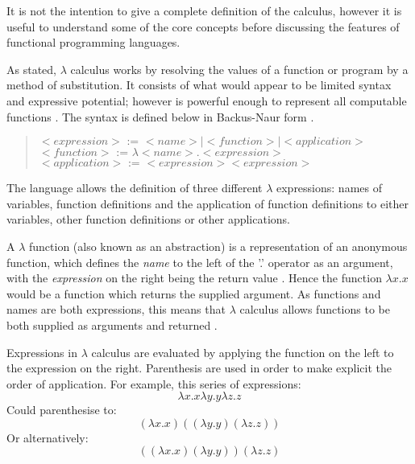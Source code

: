 \documentclass[12pt,a4paper]{article}
\begin{document}
It is not the intention to give a complete definition of the calculus, however it is useful to understand some of the core concepts before discussing the features of functional programming languages.

As stated, $\lambda$ calculus works by resolving the values of a function or program by a method of substitution. It consists of what would appear to be limited syntax and expressive potential; however is powerful enough to represent all computable functions \cite{church1936}. The syntax is defined below in Backus-Naur form \cite{bnf}.

\begin{quote}
    {$<expression> \mbox{ := }  <name> | <function> | <application>$}
    {$<function> \mbox{ := } \lambda <name>.<expression>$}\newline
    {$<application> \mbox{ := } <expression><expression> $}\newline
\end{quote}

The language allows the definition of three different $\lambda$ expressions: names of variables, function definitions and the application of function definitions to either variables, other function definitions or other applications.

A $\lambda$ function (also known as an abstraction) is a representation of an anonymous function, which defines the \emph{name} to the left of the '.' operator as an argument, with the \emph{expression} on the right being the return value \cite{church1936}. Hence the function $\lambda x.x$ would be a function which returns the supplied argument. As functions and names are both expressions, this means that $\lambda$ calculus allows functions to be both supplied as arguments and returned \cite{church1936}.

Expressions in $\lambda$ calculus are evaluated by applying the function on the left to the expression on the right. Parenthesis are used in order to make explicit the order of application. For example, this series of expressions:
\begin{displaymath}
    \lambda x.x \lambda y.y \lambda z.z
\end{displaymath}
Could parenthesise to:
\begin{displaymath}
    (\lambda x.x) ((\lambda y.y) (\lambda z.z))
\end{displaymath}
Or alternatively:
\begin{displaymath}
    ((\lambda x.x) (\lambda y.y)) (\lambda z.z)
\end{displaymath}
\end{document}
